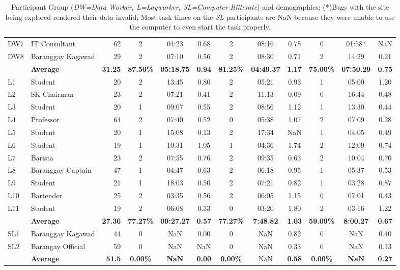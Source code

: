 \documentclass{sigchi}
\begin{document}
\begin{table}[t]
{\begin{tabular}{llr|ccc|ccc|ccc}
DW7 & IT Consultant & 62 & 2 & 04:23 & 0.68 & 2 & 08:16 & 0.78 & 0 & 01:58* & NaN \\
DW8 & Baranggay Kagawad & 29 & 2 & 07:10 & 0.56 & 2 & 08:30 & 0.71 & 2 & 14:29 & 0.21 \\
 & \textbf{Average} & \textbf{31.25} & \textbf{87.50\%} & \textbf{05:18.75} & \textbf{0.94} & \textbf{81.25\%} & \textbf{04:49.37} & \textbf{1.17} & \textbf{75.00\%} & \textbf{07:50.29} & \textbf{0.75} \\ \midrule
L1 & Student & 20 & 2 & 13:45 & 0.80 & 2 & 05:21 & 0.93 & 1 & 05:00 & 1.20 \\
L2 & SK Chairman & 23 & 2 & 07:21 & 0.41 & 2 & 11:13 & 0.09 & 0 & 16:44 & 0.48 \\
L3 & Student & 20 & 1 & 09:07 & 0.55 & 2 & 08:56 & 1.12 & 1 & 13:30 & 0.44 \\
L4 & Professor & 64 & 2 & 07:40 & 0.52 & 0 & 05:38 & 1.07 & 2 & 07:09 & 0.28 \\
L5 & Student & 20 & 1 & 15:08 & 0.13 & 2 & 17:34 & NaN & 1 & 04:05 & 0.49 \\
L6 & Student & 19 & 1 & 10:31 & 1.05 & 1 & 04:36 & 1.74 & 2 & 12:09 & 0.74 \\
L7 & Barista & 23 & 2 & 07:55 & 0.76 & 2 & 09:35 & 0.63 & 2 & 10:04 & 0.70 \\
L8 & Baranggay Captain & 47 & 1 & 04:47 & 0.63 & 2 & 06:18 & 0.95 & 1 & 05:37 & 0.53 \\
L9 & Student & 21 & 1 & 18:03 & 0.50 & 2 & 07:21 & 0.82 & 1 & 03:28 & 0.87 \\
L10 & Bartender & 25 & 2 & 03:35 & 0.56 & 2 & 06:05 & 1.15 & 0 & 07:01 & 0.43 \\
L11 & Student & 19 & 2 & 06:08 & 0.33 & 0 & 03:20 & 1.80 & 2 & 03:16 & 1.22 \\
 & \textbf{Average} & \textbf{27.36} & \textbf{77.27\%} & \textbf{09:27.27} & \textbf{0.57} & \textbf{77.27\%} & \textbf{7:48.82} & \textbf{1.03} & \textbf{59.09\%} & \textbf{8:00.27} & \textbf{0.67} \\ 
 \midrule
SL1 & Baranggay Kagawad & 44 & 0 & NaN & 0.00 & 0 & NaN & 0.82 & 0 & NaN & 0.40 \\
SL2 & Barangay Official & 59 & 0 & NaN & NaN & 0 & NaN & 0.33 & 0 & NaN & 0.13 \\
 & \textbf{Average} & \textbf{51.5} & \textbf{0.00\%} & \textbf{NaN} & \textbf{0.00} & \textbf{0.00\%} & NaN & \textbf{0.58} & \textbf{0.00\%} & \textbf{NaN} & \textbf{0.27}\\
\bottomrule
\end{tabular}%
}
\caption{Participant Group (\textit{DW=Data Worker, L=Layworker, SL=Computer Illiterate}) and demographics; (*)Bugs with the site being explored rendered their data invalid; Most task times on the \textit{SL} participants are NaN because they were unable to use the computer to even start the task properly.}
\label{tab:participants}
\end{table}
\end{document}
